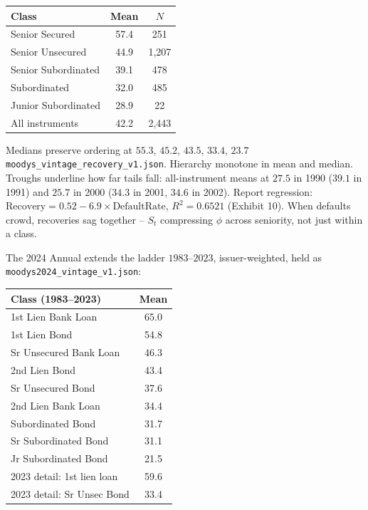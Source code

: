 \begin{center}
\small
\begin{tabular}{lcc}
\toprule
Class & Mean & $N$ \\
\midrule
Senior Secured & 57.4 & 251 \\
Senior Unsecured & 44.9 & 1,207 \\
Senior Subordinated & 39.1 & 478 \\
Subordinated & 32.0 & 485 \\
Junior Subordinated & 28.9 & 22 \\
All instruments & 42.2 & 2,443 \\
\bottomrule
\end{tabular}
\end{center}

Medians preserve ordering at $55.3$, $45.2$, $43.5$, $33.4$, $23.7$ \texttt{moodys\_vintage\_recovery\_v1.json}. Hierarchy monotone in mean and median. Troughs underline how far tails fall: all-instrument means at $27.5$ in 1990 ($39.1$ in 1991) and $25.7$ in 2000 ($34.3$ in 2001, $34.6$ in 2002). Report regression: $\text{Recovery}=0.52-6.9\times\text{DefaultRate}$, $R^2=0.6521$ (Exhibit 10). When defaults crowd, recoveries sag together -- $S_t$ compressing $\phi$ across seniority, not just within a class.

The 2024 Annual extends the ladder $1983$--$2023$, issuer-weighted, held as \texttt{moodys2024\_vintage\_v1.json}:

\begin{center}
\small
\begin{tabular}{lc}
\toprule
Class (1983--2023) & Mean \\
\midrule
1st Lien Bank Loan & 65.0 \\
1st Lien Bond & 54.8 \\
Sr Unsecured Bank Loan & 46.3 \\
2nd Lien Bond & 43.4 \\
Sr Unsecured Bond & 37.6 \\
2nd Lien Bank Loan & 34.4 \\
Subordinated Bond & 31.7 \\
Sr Subordinated Bond & 31.1 \\
Jr Subordinated Bond & 21.5 \\
\midrule
2023 detail: 1st lien loan & 59.6 \\
2023 detail: Sr Unsec Bond & 33.4 \\
\bottomrule
\end{tabular}
\end{center}

